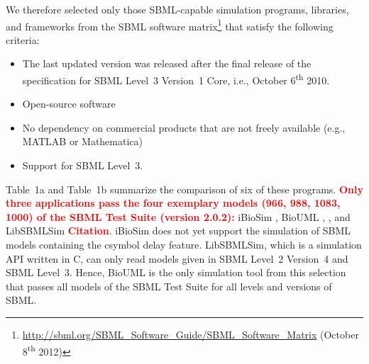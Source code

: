 \documentclass[10pt]{bmc_article}
\newenvironment{bmcformat}{\baselineskip20pt\sloppy\setboolean{publ}{false}}{\baselineskip20pt\sloppy}
\newcommand{\TODO}[1]{\textcolor{red}{\textbf{#1}}}
\begin{document}
\begin{bmcformat}
We therefore selected only those SBML-capable simulation programs, libraries, and frameworks from
the SBML software matrix\footnote{\url{http://sbml.org/SBML_Software_Guide/SBML_Software_Matrix} (October
8\textsuperscript{th} 2012)} that satisfy the following criteria:
\begin{itemize}
  \item The last updated version was released after the final release of
  the specification for SBML Level~3 Version~1 Core, i.e., October
  6\textsuperscript{th} 2010.
  \item Open-source software
  \item No dependency on commercial products that are not freely available
  (e.g., MATLAB\texttrademark{} or Mathematica\texttrademark)
  \item Support for SBML Level~3. 
\end{itemize}
Table~1a and Table~1b summarize the comparison of six of these programs.
\TODO{Only three applications pass the four exemplary models (966, 988, 1083, 1000) of the SBML Test Suite (version 2.0.2):}
iBioSim \cite{Myers2009}, BioUML \cite{Kolpakov2011}, \cite{Kolpakov2006}, and LibSBMLSim \TODO{Citation}.
iBioSim does not yet support the simulation of SBML models containing the csymbol delay feature.
LibSBMLSim, which is a simulation API written in C, can only read models given in SBML Level~2 Version~4 and SBML Level~3.
Hence, BioUML is the only simulation tool from this selection that passes all models of the SBML Test Suite for all levels and versions of SBML.


\end{bmcformat}
\end{document}
